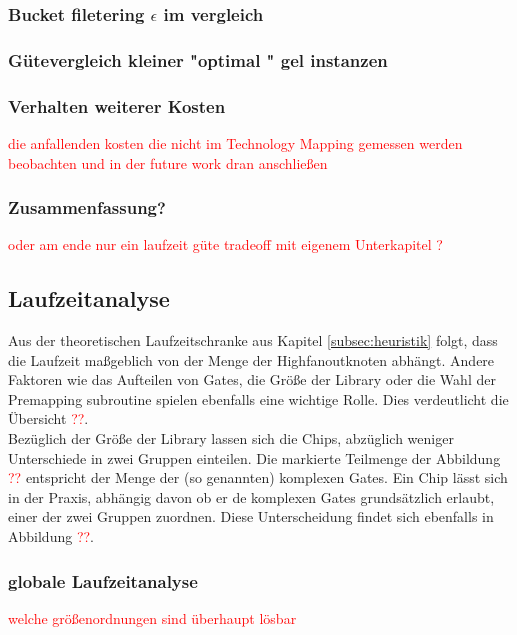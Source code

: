 \documentclass[11pt, a4paper, german]{article}
\newcommand{\TM}{Technology Mapping }
\begin{document}
\subsubsection{Bucket filetering $\epsilon$ im vergleich }

\subsubsection{Gütevergleich kleiner "optimal " gel instanzen}


\subsubsection{Verhalten weiterer Kosten}
\textcolor{red}{die anfallenden kosten die nicht im \TM gemessen werden beobachten und in der future work dran anschließen}

\subsubsection{Zusammenfassung?}
\textcolor{red}{oder am ende nur ein laufzeit güte tradeoff mit eigenem Unterkapitel ?} 
 
 
 \subsection{Laufzeitanalyse}
 \label{subsec:laufzeitanalyse}
Aus der theoretischen Laufzeitschranke aus Kapitel \ref{subsec:heuristik} folgt, dass die Laufzeit maßgeblich von der Menge der Highfanoutknoten abhängt. Andere Faktoren wie das Aufteilen von Gates, die Größe der Library oder die Wahl der Premapping subroutine spielen ebenfalls eine wichtige Rolle. Dies verdeutlicht die Übersicht \textcolor{red}{??}.\\
 Bezüglich der Größe der Library lassen sich die Chips, abzüglich weniger Unterschiede in zwei Gruppen einteilen. Die markierte Teilmenge der Abbildung \textcolor{red}{??} entspricht der Menge der (so genannten) komplexen Gates. Ein Chip lässt sich in der Praxis, abhängig davon ob er de komplexen Gates grundsätzlich erlaubt, einer der zwei Gruppen zuordnen. Diese Unterscheidung findet sich ebenfalls in Abbildung \textcolor{red}{??}.
 
\subsubsection{globale Laufzeitanalyse}
\textcolor{red}{welche größenordnungen sind überhaupt lösbar}
\end{document}
